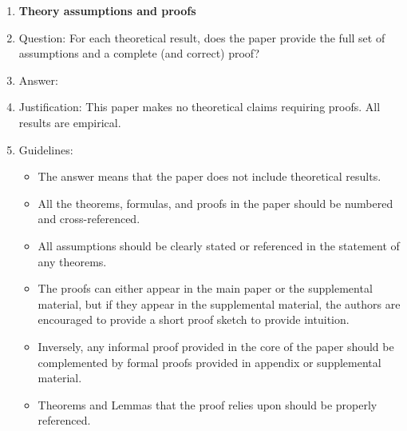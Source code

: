 \documentclass{article}
\begin{document}
\begin{enumerate}
\item {\bf Theory assumptions and proofs}
    \item[] Question: For each theoretical result, does the paper provide the full set of assumptions and a complete (and correct) proof?
    \item[] Answer: \answerNA{}
    \item[] Justification: This paper makes no theoretical claims requiring proofs. All results are empirical.
    \item[] Guidelines:
    \begin{itemize}
        \item The answer \answerNA{} means that the paper does not include theoretical results.
        \item All the theorems, formulas, and proofs in the paper should be numbered and cross-referenced.
        \item All assumptions should be clearly stated or referenced in the statement of any theorems.
        \item The proofs can either appear in the main paper or the supplemental material, but if they appear in the supplemental material, the authors are encouraged to provide a short proof sketch to provide intuition.
        \item Inversely, any informal proof provided in the core of the paper should be complemented by formal proofs provided in appendix or supplemental material.
        \item Theorems and Lemmas that the proof relies upon should be properly referenced.
    \end{itemize}


\end{enumerate}
\end{document}
